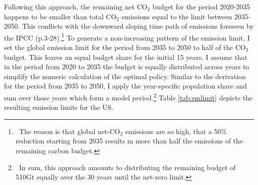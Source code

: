  Following this approach, the remaining net CO$_2$ budget for the period 2020-2035 happens to be smaller than total CO$_2$ emissions equal to the limit between 2035-2050. This conflicts with the downward sloping time path of emissions foreseen by the IPCC (p.3-28).\footnote{\ The reason is that global net-CO$_2$ emissions are so high, that a 50\% reduction starting from 2035 results in more than half the emissions of the remaining carbon budget.}
 To generate a non-increasing pattern of the emission limit, I set the global emission limit for the period from 2035 to 2050 to half of the CO$_2$ budget. This leaves an equal budget share for the initial 15 years. I assume that in the period from 2020 to 2035 the budget is equally distributed across years to simplify the numeric calculation of the optimal policy. Similar to the derivation for the period from 2035 to 2050, I apply the year-specific population share and sum over those years which form a model period.\footnote{\ In sum, this approach amounts to distributing the remaining budget of 510Gt equally over the 30 years until the net-zero limit.} Table \ref{tab:emlimit}  depicts the resulting emission limits for the US.
 
